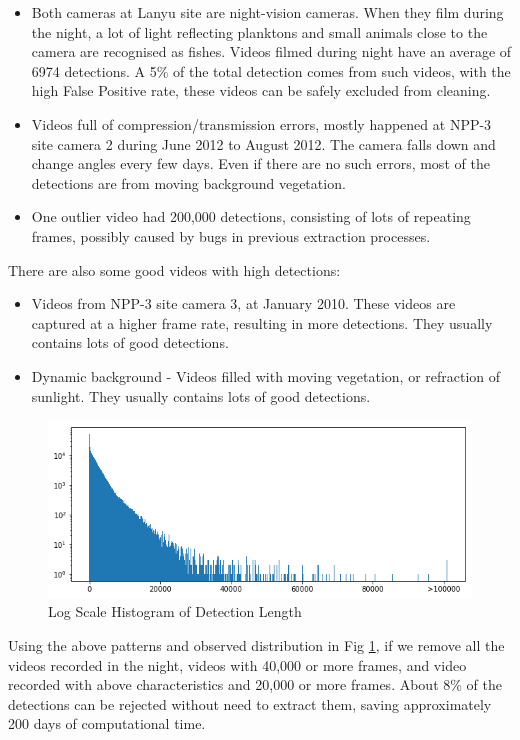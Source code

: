 \documentclass[bsc,logo,twoside,fullspacing,parskip]{infthesis}
\begin{document}
\begin{itemize}
\item
Both cameras at Lanyu site are night-vision cameras. When they film during the night, a lot of light reflecting planktons and small animals close to the camera are recognised as fishes. Videos filmed during night have an average of 6974 detections. A 5\% of the total detection comes from such videos, with the high False Positive rate, these videos can be safely excluded from cleaning.
\item
Videos full of compression/transmission errors, mostly happened at NPP-3 site camera 2 during June 2012 to August 2012. The camera falls down and change angles every few days. Even if there are no such errors, most of the detections are from moving background vegetation.
\item
One outlier video had 200,000 detections, consisting of lots of repeating frames, possibly caused by bugs in previous extraction processes.
\end{itemize}
There are also some good videos with high detections: 
\begin{itemize}
\item
Videos from NPP-3 site camera 3, at January 2010. These videos are captured at a higher frame rate, resulting in more detections. They usually contains lots of good detections.
\item
Dynamic background - Videos filled with moving vegetation, or refraction of sunlight. They usually contains lots of good detections.
\end{itemize}

\begin{figure}[h]
\centering
    \includegraphics[scale=0.40]{graph/frame_distribution.png}
    \caption{Log Scale Histogram of Detection Length}
    \label{fig:vidlength}
\end{figure}

Using the above patterns and observed distribution in Fig \ref{fig:vidlength}, if we remove all the videos recorded in the night, videos with 40,000 or more frames, and video recorded with above characteristics and 20,000 or more frames. About 8\% of the detections can be rejected without need to extract them, saving approximately 200 days of computational time.
\end{document}
